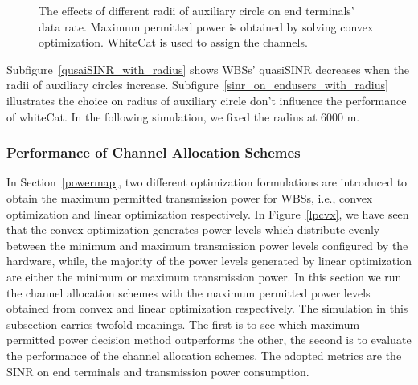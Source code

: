\documentclass[times]{ettauth}
\newcommand{\ie}{i.e., }
\theoremstyle{mytheoremstyle}
\theoremstyle{mytheoremstyle}
\theoremstyle{mytheoremstyle}
\begin{document}
\begin{figure}[h]
\centering
{}
\caption[]{The effects of different radii of auxiliary circle on end terminals' data rate. Maximum permitted power is obtained by solving convex optimization. WhiteCat is used to assign the channels.}
\label{radius}
\end{figure}

Subfigure~\ref{qusaiSINR_with_radius} shows WBSs' quasiSINR decreases when the radii of auxiliary circles increase.
Subfigure~\ref{sinr_on_endusers_with_radius} illustrates the choice on radius of auxiliary circle don't influence the performance of whiteCat.
In the following simulation, we fixed the radius at 6000 m.

     


\subsubsection*{Performance of Channel Allocation Schemes}
In Section~\ref{powermap}, two different optimization formulations are introduced to obtain the maximum permitted transmission power for WBSs, \ie convex optimization and linear optimization respectively.
In Figure~\ref{lpcvx}, we have seen that the convex optimization generates power levels which distribute evenly between the minimum and maximum transmission power levels configured by the hardware, while, the majority of the power levels generated by linear optimization are either the minimum or maximum transmission power.
In this section we run the channel allocation schemes with the maximum permitted power levels obtained from convex and linear optimization respectively.
The simulation in this subsection carries twofold meanings.
The first is to see which maximum permitted power decision method outperforms the other, the second is to evaluate the performance of the channel allocation schemes.
The adopted metrics are the SINR on end terminals and transmission power consumption.
\end{document}
